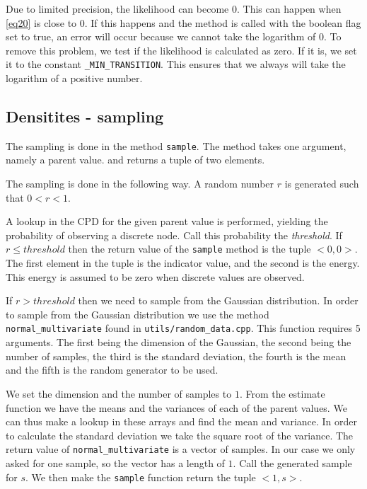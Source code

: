 \documentclass[10pt, journal, compsoc, a4paper]{IEEEtran}
\begin{document}
Due to limited precision, the likelihood can become $0$. This can happen when \ref{eq20} is close to $0$. If this happens and the method is called with the boolean flag set to true, an error will occur because we cannot take the logarithm of 0. To remove this problem, we test if the likelihood is calculated as zero. If it is, we set it to the constant \texttt{\_MIN\_TRANSITION}. This ensures that we always will take the logarithm of a positive number.



\subsection{Densitites - sampling} %
\label{sub:densitites_sampling}
The sampling is done in the method \texttt{sample}. The method takes one argument, namely a parent value. and returns a tuple of two elements. 

The sampling is done in the following way. A random number $r$ is generated such that $0 < r < 1$. 

A lookup in the CPD for the given parent value is performed, yielding the probability of observing a discrete node. Call this probability the \emph{threshold}. If $r \leq threshold$ then the return value of the \texttt{sample} method is the tuple $<0,0>$. The first element in the tuple is the indicator value, and the second is the energy. This energy is assumed to be zero when discrete values are observed.

If $r > threshold$ then we need to sample from the Gaussian distribution. In order to sample from the Gaussian distribution we use the method \texttt{normal\_multivariate} found in \texttt{utils/random\_data.cpp}. This function requires 5 arguments. The first being the dimension of the Gaussian, the second being the number of samples, the third is the standard deviation, the fourth is the mean and the fifth is the random generator to be used. 

We set the dimension and the number of samples to $1$. From the estimate function we have the means and the variances of each of the parent values. We can thus make a lookup in these arrays and find the mean and variance. In order to calculate the standard deviation we take the square root of the variance. The return value of \texttt{normal\_multivariate} is a vector of samples. In our case we only asked for one sample, so the vector has a length of $1$. Call the generated sample for $s$. We then make the \texttt{sample} function return the tuple $<1, s>$.
\end{document}
